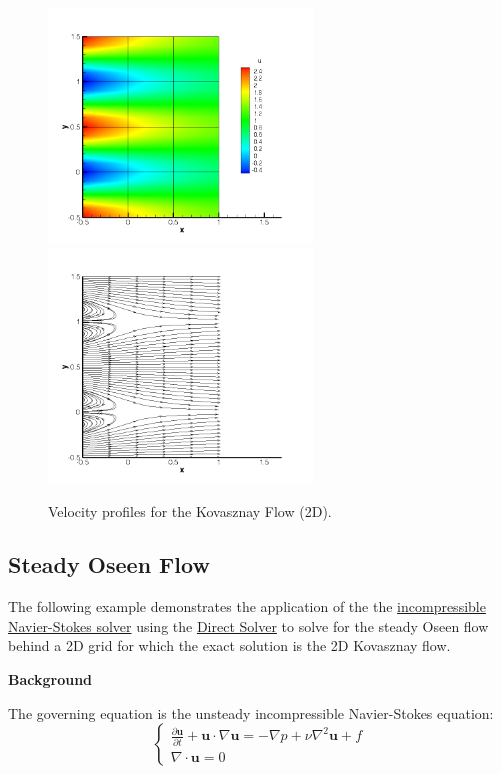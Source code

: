 \begin{figure}
\begin{center}
\includegraphics[width=7cm]{Figures/KF2DCVP8.png}
\includegraphics[width=7cm]{Figures/KF2DCVP8SL.png}
\caption{Velocity profiles for the Kovasznay Flow (2D).}
\end{center}
\end{figure}


\subsection{Steady Oseen Flow}
\label{KovasznayFlow2D}
The following example demonstrates the application of the the \hyperref[IncNSsolver]{incompressible Navier-Stokes solver} using the \hyperref[DirectSolv]{Direct Solver} to solve for the steady Oseen flow behind a 2D grid for which the exact solution is the 2D Kovasznay flow.

\textbf{Background}

The governing equation is the unsteady incompressible Navier-Stokes equation:
\begin{equation}
\begin{cases}
\frac{\partial \textbf{u}}{\partial t} + \textbf{u} \cdot \nabla \textbf{u} = - \nabla p + \nu \nabla^2 \textbf{u} + f \\
\nabla \cdot \textbf{u} = 0
\end{cases}
\end{equation}

